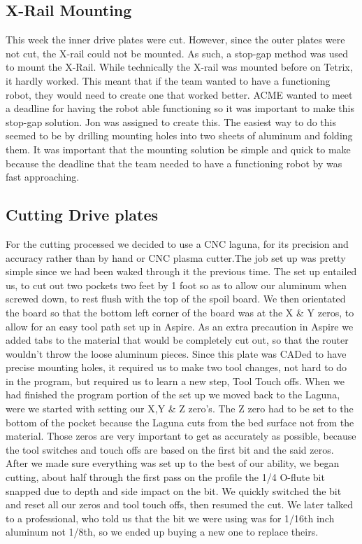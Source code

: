 \documentclass{article}
\begin{document}
\subsection{X-Rail Mounting}
This week the inner drive plates were cut. However, since the outer plates were not cut, the X-rail could not be mounted. As such, a stop-gap method was used to mount the X-Rail. While technically the X-rail was mounted before on Tetrix, it hardly worked. This meant that if the team wanted to have a functioning robot, they would need to create one that worked better. ACME wanted to meet a deadline for having the robot able functioning so it was important to make this stop-gap solution. Jon was assigned to create this. The easiest way to do this seemed to be by drilling mounting holes into two sheets of aluminum and folding them. It was important that the mounting solution be simple and quick to make because the deadline that the team needed to have a functioning robot by was fast approaching. 

\subsection{Cutting Drive plates}
For the cutting processed we decided to use a CNC laguna, for its precision and accuracy rather than by hand or CNC plasma cutter.The job set up was pretty simple since we had been waked through it the previous time. The set up entailed us, to cut out two pockets two feet by 1 foot so as to allow our aluminum when screwed down, to rest flush with the top of the spoil board. We then orientated the board so that the bottom left corner of the board was at the X & Y zeros, to allow for an easy tool path set up in Aspire. As an extra precaution in Aspire we added tabs to the material that would be completely cut out, so that the router wouldn't throw the loose aluminum pieces. Since this plate was CADed to have precise mounting holes, it required us to make two tool changes, not hard to do in the program, but required us to learn a new step, Tool Touch offs. When we had finished the program portion of the set up we moved back to the Laguna, were we started with setting our X,Y & Z zero's. The Z zero had to be set to the bottom of the pocket because the Laguna cuts from the bed surface not from the material. Those zeros are very important to get as accurately as possible, because the tool switches and touch offs are based on the first bit and the said zeros. After we made sure everything was set up to the best of our ability, we began cutting, about half through the first pass on the profile the 1/4 O-flute bit snapped due to depth and side impact on the bit. We quickly switched the bit and reset all our zeros and tool touch offs, then resumed the cut. We later talked to a professional, who told us that the bit we were using was for 1/16th inch aluminum not 1/8th, so we ended up buying a new one to replace theirs.  
\end{document}
